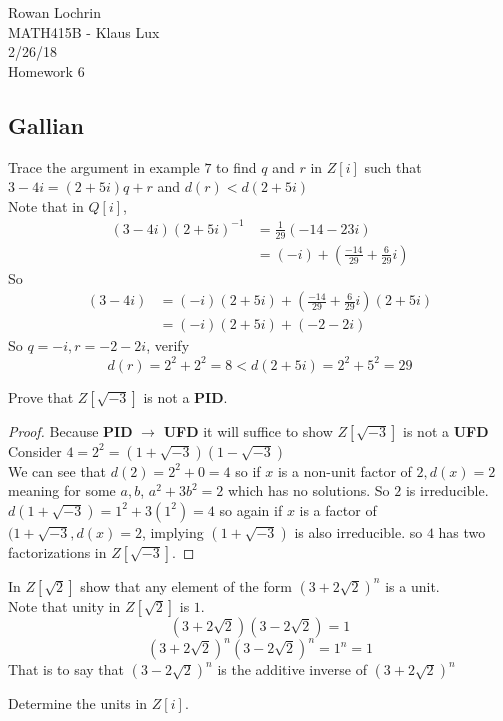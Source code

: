 \documentclass[11pt]{article}
\begin{document}
\begin{flushleft}
	Rowan Lochrin \\
	MATH415B - Klaus Lux \\
	2/26/18 \\
	Homework 6
\end{flushleft}
\begin{description}
	\section{Gallian}
	\item[11] Trace the argument in example $7$ to find $q$ and $r$ in
		$Z[i]$ such that $3-4i = (2+5i)q+r$ and $d(r) < d(2+5i)$\\
		Note that in $Q[i]$, 
		\begin{align*}
			(3-4i)(2+5i)^{-1} &= \frac{1}{29}(-14-23i)\\
			& = (-i) + (\frac{-14}{29} + \frac{6}{29}i)
		\end{align*}
		So
		\begin{align*}
		(3-4i)  &= (-i)(2+5i)+ (\frac{-14}{29} + \frac{6}{29}i)(2+5i)\\
				 &= (-i)(2+5i) + (-2-2i)
		\end{align*}
		So $q = -i, r= -2-2i$, verify 
		$$d(r) = 2^2 + 2^2 = 8 < d(2+5i) = 2^2 + 5^2 = 29$$
	\item[20]
		Prove that $Z[\sqrt{-3}]$ is not a \textbf{PID}.
		\begin{proof}
			Because \textbf{PID} $\rightarrow$ \textbf{UFD} it will
			suffice to show $Z[\sqrt{-3}]$ is not a \textbf{UFD}
			Consider $4 = 2^2 = (1+\sqrt{-3})(1-\sqrt{-3})$ \\
			We can see that $d(2) = 2^2 + 0 = 4$ so if $x$ is a
			non-unit factor of $2, d(x) = 2 $ meaning  for some
			$a,b$, $a^2 + 3b^2 =2$ which has no solutions.
			So $2$ is irreducible. 
			$d(1+\sqrt{-3}) = 1^2 + 3(1^2) = 4 $ so again if $x$
			is a factor of $(1+\sqrt{-3}, d(x) = 2$, implying
			$(1+\sqrt{-3})$ is also irreducible. 
			so  $4$ has two factorizations in $Z[\sqrt{-3}]$.
		\end{proof}
	\item[26] In $Z[\sqrt2]$ show that any element of the form
		$(3+2\sqrt2)^n$ is a unit.\\
		Note that unity in $Z[\sqrt2]$ is $1$.
		$$(3+2\sqrt2)(3-2\sqrt2) = 1$$
		$$(3+2\sqrt2)^n (3-2\sqrt2)^n = 1^n = 1 $$
		That is to say that $ (3-2\sqrt2)^n$ is the additive inverse of
	$(3+2\sqrt2)^n$
	\item[32]
		Determine the units in $Z[i]$. \\

\end{description}
\end{document}

